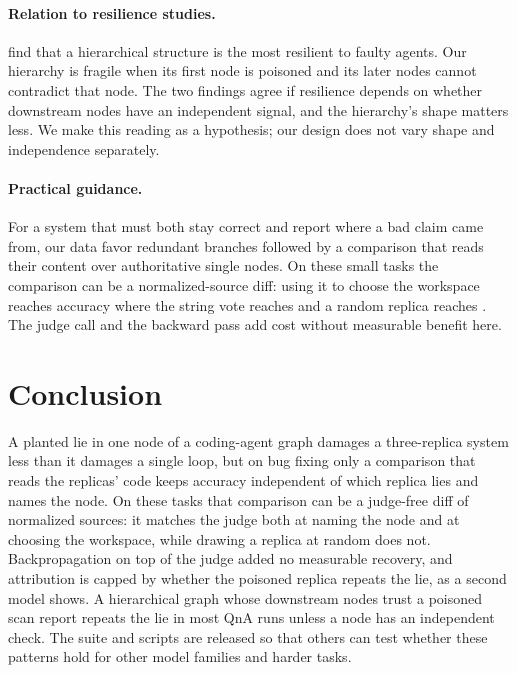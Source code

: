 \documentclass[11pt]{article}
\begin{document}
\paragraph{Relation to resilience studies.}
\citet{huang2024resilience} find that a hierarchical structure is the most resilient to faulty agents.
Our hierarchy is fragile when its first node is poisoned and its later nodes cannot contradict that node.
The two findings agree if resilience depends on whether downstream nodes have an independent signal, and the hierarchy's shape matters less.
We make this reading as a hypothesis; our design does not vary shape and independence separately.

\paragraph{Practical guidance.}
For a system that must both stay correct and report where a bad claim came from, our data favor redundant branches followed by a comparison that reads their content over authoritative single nodes.
On these small tasks the comparison can be a normalized-source diff: using it to choose the workspace reaches accuracy \RateSelMainFlatThreeCodeAst{} where the string vote reaches \RateSelMainFlatThreeCodeActual{} and a random replica reaches \RateSelMainFlatThreeCodeUniform{}. The judge call and the backward pass add cost without measurable benefit here.

\section{Conclusion}
A planted lie in one node of a coding-agent graph damages a three-replica system less than it damages a single loop, but on bug fixing only a comparison that reads the replicas' code keeps accuracy independent of which replica lies and names the node. On these tasks that comparison can be a judge-free diff of normalized sources: it matches the judge both at naming the node and at choosing the workspace, while drawing a replica at random does not.
Backpropagation on top of the judge added no measurable recovery, and attribution is capped by whether the poisoned replica repeats the lie, as a second model shows.
A hierarchical graph whose downstream nodes trust a poisoned scan report repeats the lie in most QnA runs unless a node has an independent check.
The suite and scripts are released so that others can test whether these patterns hold for other model families and harder tasks.
\end{document}
